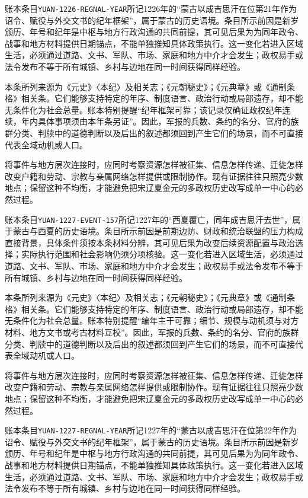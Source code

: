 账本条目\texttt{YUAN-1226-REGNAL-YEAR}所记1226年的“蒙古以成吉思汗在位第21年作为诏令、赋役与外交文书的纪年框架”，属于蒙古的历史语境。条目所示前因是新岁颁历、年号和纪年是中枢与地方行政沟通的共同前提，其可见后果为为同年政令、战事和地方材料提供日期锚点，不能单独推知具体政策执行。这一变化若进入区域生活，必须通过道路、文书、军队、市场、家庭和地方中介才会发生；政权易手或法令发布不等于所有城镇、乡村与边地在同一时间获得同样经验。

本条所列来源为《元史》〈本纪〉及相关志；《元朝秘史》；《元典章》或《通制条格》相关条。它们能够支持特定的年序、制度语言、政治行动或局部遗存，却不能无条件化为社会总量。账本特别提醒“纪年框架可靠；该记录仅确证政权纪年连续，年内具体事项须由本年条另证”。因此，军报的兵数、条约的名分、官府的族群分类、判牍中的道德判断以及后出的叙述都须回到产生它们的场景，而不可直接代表全域动机或人口。

将事件与地方层次连接时，应同时考察资源怎样被征集、信息怎样传递、迁徙怎样改变户籍和劳动、宗教与亲属网络怎样提供或限制协作。现有证据往往只照亮少数地点；保留这种不均衡，才能避免把宋辽夏金元的多政权历史改写成单一中心的必然过程。

账本条目\texttt{YUAN-1227-EVENT-157}所记1227年的“西夏覆亡，同年成吉思汗去世”，属于蒙古与西夏的历史语境。条目所示前因是前期边防、财政和统治联盟的压力构成直接背景，具体条件须按本条材料分辨，其可见后果为改变后续资源配置与政治选择；实际执行范围和社会影响仍须分项核验。这一变化若进入区域生活，必须通过道路、文书、军队、市场、家庭和地方中介才会发生；政权易手或法令发布不等于所有城镇、乡村与边地在同一时间获得同样经验。

本条所列来源为《元史》〈本纪〉及相关志；《元朝秘史》；《元典章》或《通制条格》相关条。它们能够支持特定的年序、制度语言、政治行动或局部遗存，却不能无条件化为社会总量。账本特别提醒“编年主干可靠；细节、规模与动机须与对方材料、地方文书或考古材料互校”。因此，军报的兵数、条约的名分、官府的族群分类、判牍中的道德判断以及后出的叙述都须回到产生它们的场景，而不可直接代表全域动机或人口。

将事件与地方层次连接时，应同时考察资源怎样被征集、信息怎样传递、迁徙怎样改变户籍和劳动、宗教与亲属网络怎样提供或限制协作。现有证据往往只照亮少数地点；保留这种不均衡，才能避免把宋辽夏金元的多政权历史改写成单一中心的必然过程。

账本条目\texttt{YUAN-1227-REGNAL-YEAR}所记1227年的“蒙古以成吉思汗在位第22年作为诏令、赋役与外交文书的纪年框架”，属于蒙古的历史语境。条目所示前因是新岁颁历、年号和纪年是中枢与地方行政沟通的共同前提，其可见后果为为同年政令、战事和地方材料提供日期锚点，不能单独推知具体政策执行。这一变化若进入区域生活，必须通过道路、文书、军队、市场、家庭和地方中介才会发生；政权易手或法令发布不等于所有城镇、乡村与边地在同一时间获得同样经验。

